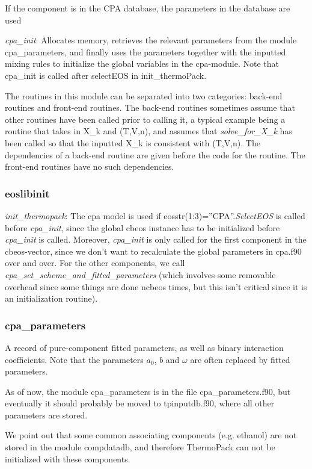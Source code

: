 \documentclass[english]{../thermomemo/thermomemo}
\begin{document}
 If the component is in the CPA database, the parameters in the database are used

\textit{cpa\_init}: Allocates memory, retrieves the relevant parameters from the module cpa\_parameters, and finally uses the parameters together with the inputted mixing rules to initialize the global variables in the cpa-module. Note that cpa\_init is called after selectEOS in init\_thermoPack.

The routines in this module can be separated into two categories: back-end routines and front-end routines. The back-end routines sometimes assume that other routines have been called prior to calling it, a typical example being a routine that takes in X\_k and (T,V,n), and assumes that \textit{solve\_for\_X\_k} has been called so that the inputted X\_k is consistent with (T,V,n). The dependencies of a back-end routine are given before the code for the routine. The front-end routines have no such dependencies.

\subsubsection*{eoslibinit}
\textit{init\_thermopack}: The cpa model is used if eosstr(1:3)=''CPA''.\textit{SelectEOS} is called before \textit{cpa\_init}, since the global cbeos instance has to be initialized before \textit{cpa\_init} is called. Moreover, \textit{cpa\_init} is only called for the first component in the cbeos-vector, since we don't want to recalculate the global parameters in cpa.f90 over and over. For the other components, we call \textit{cpa\_set\_scheme\_and\_fitted\_parameters} (which involves some removable overhead since some things are done ncbeos times, but this isn't critical since it is an initialization routine).

\subsubsection*{cpa\_parameters}
A record of pure-component fitted parameters, as well as binary interaction coefficients. Note that the parameters $a_0$, $b$ and $\omega$ are often replaced by fitted parameters.

As of now, the module cpa\_parameters is in the file cpa\_parameters.f90, but eventually it should probably be moved to tpinputdb.f90, where all other parameters are stored.

We point out that some common associating components (e.g. ethanol) are not stored in the module compdatadb, and therefore ThermoPack can not be initialized with these components.
\end{document}
